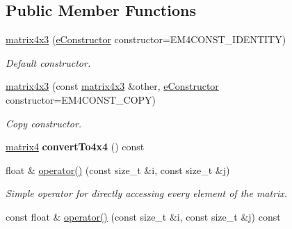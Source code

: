 \subsection*{Public Member Functions}
\begin{DoxyCompactItemize}
\item 
\hyperlink{classirr_1_1core_1_1matrix4x3_a3e990bb68e47cfd855bfdaa118468d48}{matrix4x3} (\hyperlink{classirr_1_1core_1_1matrix4x3_a71900f0a319758c8bd685289aafcf4d7}{e\+Constructor} constructor=E\+M4\+C\+O\+N\+S\+T\+\_\+\+I\+D\+E\+N\+T\+I\+TY)
\begin{DoxyCompactList}\small\item\em Default constructor. \end{DoxyCompactList}\item 
\hyperlink{classirr_1_1core_1_1matrix4x3_a4fbbbf9473543f026e28ee09670cd1ad}{matrix4x3} (const \hyperlink{classirr_1_1core_1_1matrix4x3}{matrix4x3} \&other, \hyperlink{classirr_1_1core_1_1matrix4x3_a71900f0a319758c8bd685289aafcf4d7}{e\+Constructor} constructor=E\+M4\+C\+O\+N\+S\+T\+\_\+\+C\+O\+PY)
\begin{DoxyCompactList}\small\item\em Copy constructor. \end{DoxyCompactList}\item 
\hyperlink{namespaceirr_1_1core_a73fa92e638c5ca97efd72da307cc9b65}{matrix4} {\bfseries convert\+To4x4} () const \hypertarget{classirr_1_1core_1_1matrix4x3_a1630eff0c1b6c26ca3660ace1480213c}{}\label{classirr_1_1core_1_1matrix4x3_a1630eff0c1b6c26ca3660ace1480213c}

\item 
float \& \hyperlink{classirr_1_1core_1_1matrix4x3_a8f1a9e944105ed5645b0c854d64519ad}{operator()} (const size\+\_\+t \&i, const size\+\_\+t \&j)\hypertarget{classirr_1_1core_1_1matrix4x3_a8f1a9e944105ed5645b0c854d64519ad}{}\label{classirr_1_1core_1_1matrix4x3_a8f1a9e944105ed5645b0c854d64519ad}

\begin{DoxyCompactList}\small\item\em Simple operator for directly accessing every element of the matrix. \end{DoxyCompactList}\item 
const float \& \hyperlink{classirr_1_1core_1_1matrix4x3_a246e4d29eb466e55d67c7a7fb9183af0}{operator()} (const size\+\_\+t \&i, const size\+\_\+t \&j) const \hypertarget{classirr_1_1core_1_1matrix4x3_a246e4d29eb466e55d67c7a7fb9183af0}{}\label{classirr_1_1core_1_1matrix4x3_a246e4d29eb466e55d67c7a7fb9183af0}


\end{DoxyCompactItemize}

